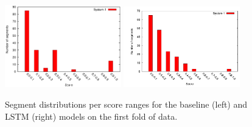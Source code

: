 \documentclass[letterpaper, 12 pt, conference]{ieeeconf}
\begin{document}
\begin{figure}[htb!]
  \centering
  \includegraphics[width=0.45\textwidth]{fold_1_score}
  \includegraphics[width=0.45\textwidth]{lstm_fold_1_score_bar_graph}
  \caption{Segment distributions per score ranges for the baseline (left) and LSTM (right) models on the first fold of data.}
  \label{fig:fold_1_score}
\end{figure}
\end{document}
